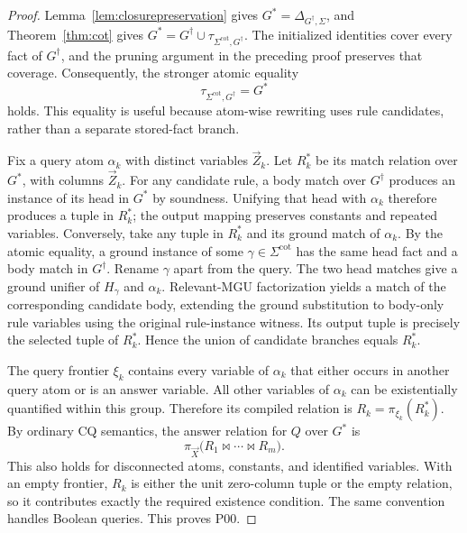 \documentclass[conference]{IEEEtran}
\theoremstyle{definition}
\newcommand{\vect}[1]{\vec{#1}}
\newcommand{\Gc}{G^{\dagger}}
\newcommand{\Sig}{\Sigma}
\newcommand{\Sigcot}{\Sig^{\mathrm{cot}}}
\begin{document}
\begin{proof}
Lemma~\ref{lem:closurepreservation} gives
$G^{*}=\Delta_{\Gc,\Sig}$, and Theorem~\ref{thm:cot} gives
$G^{*}=\Gc\cup\tau_{\Sigcot,\Gc}$.
The initialized identities cover every fact of $\Gc$, and the
pruning argument in the preceding proof preserves that coverage.
Consequently, the stronger atomic equality
\[
\tau_{\Sigcot,\Gc}=G^{*}
\]
holds. This equality is useful because atom-wise rewriting uses
rule candidates, rather than a separate stored-fact branch.

Fix a query atom $\alpha_k$ with distinct variables $\vect{Z}_k$.
Let $R_k^{*}$ be its match relation over $G^{*}$, with columns
$\vect{Z}_k$. For any candidate rule, a body match over $\Gc$
produces an instance of its head in $G^{*}$ by soundness. Unifying
that head with $\alpha_k$ therefore produces a tuple in $R_k^{*}$;
the output mapping preserves constants and repeated variables.
Conversely, take any tuple in $R_k^{*}$ and its ground match of
$\alpha_k$. By the atomic equality, a ground instance of some
$\gamma\in\Sigcot$ has the same head fact and a body match in $\Gc$.
Rename $\gamma$ apart from the query. The two head matches give
a ground unifier of $H_\gamma$ and $\alpha_k$.
Relevant-MGU factorization yields a match of the corresponding
candidate body, extending the ground substitution to body-only
rule variables using the original rule-instance witness. Its
output tuple is precisely the selected tuple
of $R_k^{*}$. Hence the union of candidate branches equals $R_k^{*}$.

The query frontier $\xi_k$ contains every variable of $\alpha_k$
that either occurs in another query atom or is an answer variable.
All other variables of $\alpha_k$ can be existentially quantified
within this group. Therefore its compiled relation is
$R_k=\pi_{\xi_k}(R_k^{*})$. By ordinary CQ semantics, the answer relation
for $Q$ over $G^{*}$ is
\[
\pi_{\vect{X}}\bigl(R_1\bowtie\cdots\bowtie R_m\bigr).
\]
This also holds for disconnected atoms, constants, and identified
variables. With an empty frontier, $R_k$ is either the unit
zero-column tuple or the empty relation, so it contributes exactly
the required existence condition. The same convention handles
Boolean queries. This proves P00.


\end{proof}
\end{document}
